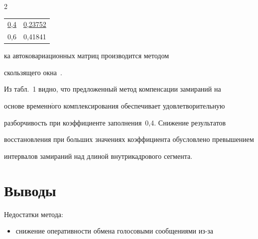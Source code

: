 \begin{multicols}{2}
\begin{center}
{\begin{tabular}{|c|c|}
\underline{0,4}&\underline{0,23752}\\


0,6&0,41841\\


\hline


\end{tabular}}


\end{center}







\vspace*{8pt}





\noindent


ка автоковариационных матриц производится методом 


скользящего окна~\cite{12-pr}.








     


     Из табл.~1 видно, что предложенный метод компенсации замираний на 


основе временн$\acute{\mbox{о}}$го комп\-лек\-си\-ро\-ва\-ния обеспечивает удовлетворительную 


разборчивость при коэффициенте заполнения~0,4. Снижение результатов 


восстановления при больших значениях коэффициента обусловлено превышением 


интервалов замираний над длиной внутрикадрового сегмента. 





\vspace*{-6pt}





     \section{Выводы}


     


     Недостатки метода: 


     \begin{itemize}


\item снижение оперативности обмена голосовыми сообщениями из-за 



\end{itemize}
\end{multicols}
